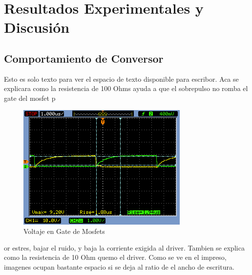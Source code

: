 \chapter{Resultados Experimentales y Discusión}
\label{Resultados Experimentales y Discusión}
\section{Comportamiento de Conversor}
Esto es solo texto para ver el espacio de texto disponible para escribor. Aca se explicara como la resistencia de 100 Ohms ayuda a que el sobrepulso no romba el gate  del mosfet p
\begin{figure}[h!]
    \centering
    \includegraphics[width=1\linewidth]{imagenes/testosc0.png}
    \caption{Voltaje en Gate de Mosfets}
    \label{fig:tension_gate_mosfets}
\end{figure}
or estres, bajar el ruido, y baja la corriente exigida al driver. Tambien se explica como la resistencia de 10 Ohm quemo el driver. Como se ve en el impreso, imagenes ocupan bastante espacio si se deja al ratio de el ancho de escritura.

